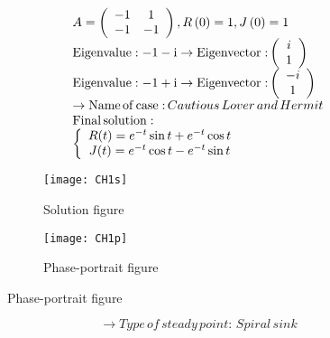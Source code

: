 \documentclass[a4paper]{article}
\begin{document}
\[\begin{array}{l}
A = \left( {\begin{array}{*{20}{c}}
{ - 1}&1\\
{ - 1}&{ - 1}
\end{array}} \right),R\left( 0 \right) = 1,J\left( 0 \right) = 1\\
{\rm{Eigenvalue: - 1 - i}} \to {\rm{Eigenvector:}}\left( {\begin{array}{*{20}{c}}
i\\
1
\end{array}} \right)\\
{\rm{Eigenvalue: - 1 + i}} \to {\rm{Eigenvector:}}\left( {\begin{array}{*{20}{c}}
{ - i}\\
1
\end{array}} \right)\\
 \to {\rm{Name}}\,{\rm{of}}\,{\rm{case:}}\,Cautious\,Lover\,and\,Hermit\\
{\rm{Final}}\,{\rm{solution:}}\\
\left\{ {\begin{array}{*{20}{c}}
{R(t) = {e^{ - t}}\sin t + {e^{ - t}}\cos t}\\
{J(t) = {e^{ - t}}\cos t - {e^{ - t}}\sin t}
\end{array}} \right.
\end{array}\]
\begin{figure}[H]
\centering
\begin{subfigure}{.5\textwidth}
  \centering
  \texttt{[image: CH1s]}
  \caption*{Solution figure}
\end{subfigure}%
\begin{subfigure}{.5\textwidth}
  \centering
  \texttt{[image: CH1p]}
  \caption*{Phase-portrait figure}
\end{subfigure}
\end{figure}
\[  \to  Type\,of\,steady\,point:\,Spiral\,sink\]
\end{document}
